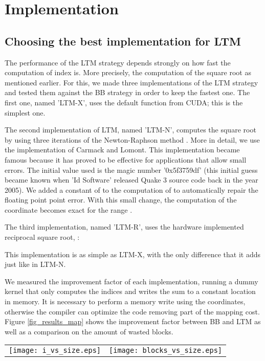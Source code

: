 \documentclass[conference]{IEEEtran}
\begin{document}
\section{Implementation}
\label{sec_implementation}
\subsection{Choosing the best implementation for LTM}
The performance of the LTM strategy depends strongly on how fast the computation of index  is. More precisely, the 
computation of the square root as mentioned earlier. 
For this, we made three implementations of the LTM strategy and tested them against the BB strategy in order to keep the fastest one. 
The first one, named 'LTM-X', uses the default  function from CUDA; this is the simplest one. 

The second implementation of LTM, named 'LTM-N', computes the square root by using three iterations of the Newton-Raphson method 
\cite{Ypma:1995:HDN:222504.222510, Peelle:1974:TNS:585882.585889}. More in detail, we use the implementation of Carmack and Lomont. 
This implementation became famous because it has proved to be effective for applications that allow small errors.
The initial value used is the magic number '0x5f3759df' (this initial guess became known when 'Id Software' released Quake 3 source code back in the year 2005). 
We added a constant of  to the computation of  to automatically repair the floating point point error. 
With this small change, the computation of the  coordinate becomes exact for the range .

The third implementation, named 'LTM-R', uses the hardware implemented reciprocal square root, :

This implementation is as simple as LTM-X, with the only difference that it adds  just like in LTM-N.

We measured the improvement factor of each implementation, running a dummy kernel that only computes the  indices and writes 
the sum  to a constant location in memory. It is necessary to perform a memory write using the coordinates, otherwise the compiler 
can optimize the code removing part of the mapping cost. 
Figure \ref{fig_results_map} shows the improvement factor between BB and LTM as well as a comparison on the amount of wasted blocks.
\begin{figure*}[ht!]
\centering
\begin{tabular}{cc}
\texttt{[image: i\_vs\_size.eps]} & \texttt{[image: blocks\_vs\_size.eps]}
\end{tabular}
\caption{Only the LTM-R implementation runs faster than the BB strategy. On the right, the number of wasted blocks a a function of .}
\label{fig_results_map}
\end{figure*}
\end{document}
